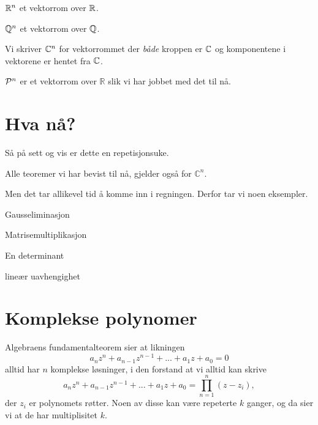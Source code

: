 \begin{ex}
$\R^n$ et vektorrom over $\R$.
\end{ex}
\begin{ex}
$\Q^n$ et vektorrom over $\Q$.
\end{ex}
\begin{ex}
Vi skriver $\C^n$ for vektorrommet der \emph{både} kroppen er $\C$ og komponentene i vektorene er hentet fra $\C$.
\end{ex}
\begin{ex}
$\P^n$ er et vektorrom over $\mathbb R$ slik vi har jobbet med det til nå.
\end{ex}





\section*{Hva nå?}


Så på sett og vis er dette en repetisjonsuke. 

\begin{thm}
Alle teoremer vi har bevist til nå, gjelder også for $\mathbb C^n$. 
\end{thm}

Men det tar allikevel tid å komme inn i regningen. Derfor tar vi noen eksempler.

\begin{ex}
Gausseliminasjon
\end{ex}

\begin{ex}
Matrisemultiplikasjon
\end{ex}

\begin{ex}
En determinant
\end{ex}

\begin{ex}
lineær uavhengighet
\end{ex}



\section*{Komplekse polynomer}

Algebraens fundamentalteorem sier at likningen
\[
a_nz^n+a_{n-1}z^{n-1}+...+a_1z+a_0=0
\]
alltid har $n$ komplekse løsninger, i den forstand at vi alltid kan skrive
\[
a_nz^n+a_{n-1}z^{n-1}+...+a_1z+a_0=\prod_{n=1}^n (z-z_i),
\]
der $z_i$ er polynomets røtter. Noen av disse kan være repeterte $k$ ganger, og da sier vi at de har multiplisitet $k$. 

